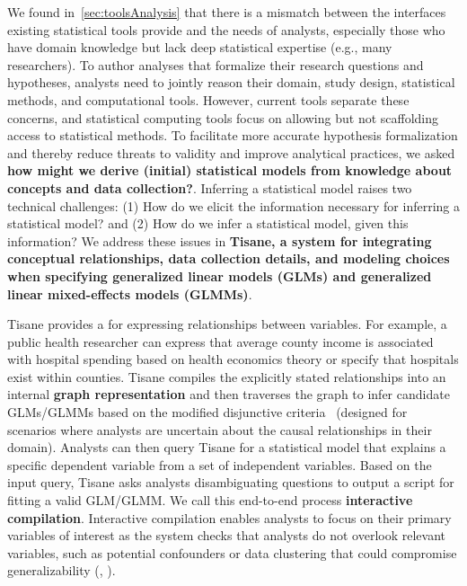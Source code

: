 We found in~\autoref{sec:toolsAnalysis} that there is a mismatch between the
interfaces existing statistical tools provide and the needs of analysts,
especially those who have domain knowledge but lack deep statistical expertise
(e.g., many researchers). To author analyses that formalize their research
questions and hypotheses, analysts need to jointly reason their domain, study
design, statistical methods, and computational tools. However, current tools
separate these concerns, and statistical computing tools focus on allowing but
not scaffolding access to statistical methods. To facilitate more accurate
hypothesis formalization and thereby reduce threats to validity and improve
analytical practices, we asked \textbf{how might we derive (initial) statistical
models from knowledge about concepts and data collection?}. Inferring a statistical model raises two
technical challenges: (1) How do we elicit the information necessary for
inferring a statistical model? and (2) How do we infer a statistical model,
given this information? We address these issues in \textbf{Tisane, a system for integrating
conceptual relationships, data collection details, and modeling choices when
specifying generalized linear models (GLMs) and generalized linear mixed-effects
models (GLMMs)}. 

Tisane provides a \textbf{\SDSLlong} for expressing %
relationships between variables. For example, a public health researcher can
express that average county income is associated with hospital spending based on
health economics theory or specify that hospitals exist within counties.
Tisane compiles the explicitly stated relationships into an internal
\textbf{graph representation} and then traverses the graph to infer candidate
GLMs/GLMMs based on the modified disjunctive
criteria~\cite{vanderweele2019modifiedDisjunctiveCriterion} (designed for
scenarios where analysts are uncertain about the causal relationships in their
domain). Analysts can then query Tisane for a statistical model that explains a
specific dependent variable from a set of independent variables. Based on the
input query, Tisane asks analysts disambiguating questions to output a script
for fitting a valid GLM/GLMM. We call this end-to-end process \textbf{interactive
compilation}. Interactive compilation enables analysts to focus
on their primary variables of interest as the system checks that analysts do not
overlook relevant variables, such as potential confounders or data clustering
that could compromise generalizability (\higherLevel, \connectConceptualStats). 

